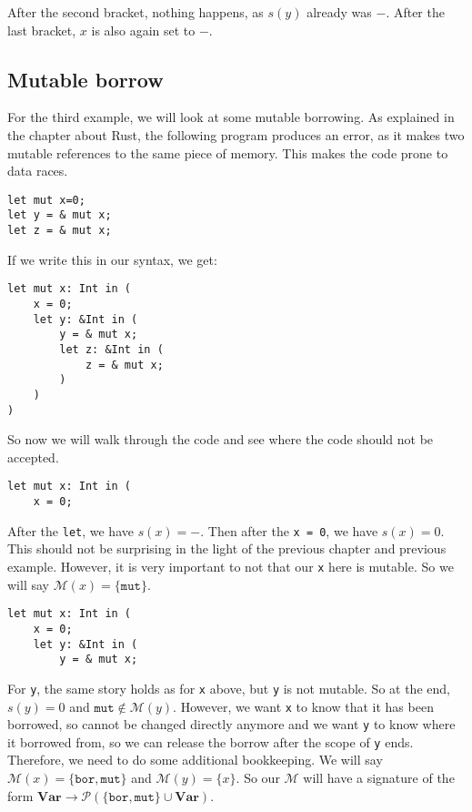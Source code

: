 After the second bracket, nothing happens, as $s(y)$ already was $-$. After the last bracket, $x$ is also again set to $-$. 

\subsection{Mutable borrow}

For the third example, we will look at some mutable borrowing. As explained in the chapter about Rust, the following program produces an error, as it makes two mutable references to the same piece of memory. This makes the code prone to data races. 

\begin{verbatim}
let mut x=0;
let y = & mut x; 
let z = & mut x;
\end{verbatim}

If we write this in our syntax, we get: 

\begin{verbatim}
let mut x: Int in (
    x = 0;
    let y: &Int in (
        y = & mut x;
        let z: &Int in (
            z = & mut x;
        )
    )
)
\end{verbatim} 

So now we will walk through the code and see where the code should not be accepted. 

\begin{verbatim}
let mut x: Int in (
    x = 0;
\end{verbatim}

After the \texttt{let}, we have $s(x) = -$. Then after the \texttt{x = 0}, we have $s(x) = 0$. This should not be surprising in the light of the previous chapter and previous example. However, it is very important to not that our \texttt{x} here is mutable. So we will say $\mathcal{M}(x) = \{\texttt{mut}\}$. 

\begin{verbatim}
let mut x: Int in (
    x = 0;
    let y: &Int in (
        y = & mut x;
\end{verbatim}

For \texttt{y}, the same story holds as for \texttt{x} above, but \texttt{y} is not mutable. So at the end, $s(y) = 0$ and $\texttt{mut} \not \in \mathcal{M}(y)$. However, we want \texttt{x} to know that it has been borrowed, so cannot be changed directly anymore and we want \texttt{y} to know where it borrowed from, so we can release the borrow after the scope of \texttt{y} ends. Therefore, we need to do some additional bookkeeping. We will say $\mathcal{M}(x) = \{\texttt{bor}, \texttt{mut}\}$ and $\mathcal{M}(y) = \{x\}$. So our $\mathcal{M}$ will have a signature of the form $\textbf{Var} \to \mathcal{P}(\{\texttt{bor}, \texttt{mut}\} \cup \textbf{Var})$.

